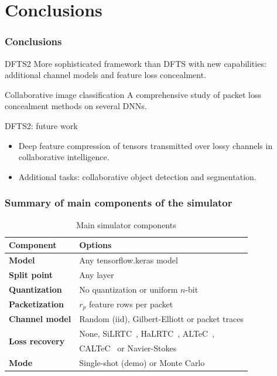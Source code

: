 \documentclass[aspectratio=169]{beamer}
\begin{document}
\section{Conclusions}
\begin{frame}
\frametitle{Conclusions}
	\begin{block}{DFTS2}
		More sophisticated framework than DFTS with new capabilities: additional channel models and feature loss concealment.
	\end{block}
\begin{block}{Collaborative image classification}
	A comprehensive study of packet loss concealment methods on several DNNs.
\end{block}
\begin{block}{DFTS2: future work}
\begin{itemize}
    \item Deep feature compression of tensors transmitted over lossy channels in collaborative intelligence.
    \item Additional tasks: collaborative object detection and segmentation.
\end{itemize}
\end{block}
\end{frame}

\begin{frame}
\frametitle{Summary of main components of the simulator}
\begin{table}[t]   \caption{Main simulator components}
  \label{tab:description:components}
  \centering
 \begin{tabular}{ l | l }
   \textbf{Component} & \textbf{Options} \\
      \hline
      \hline
      \textbf{Model} & Any tensorflow.keras model \\
      \hline  
      \textbf{Split point} & Any layer \\
      \hline
      \textbf{Quantization} & No quantization or uniform $n$-bit \\
      \hline
      \textbf{Packetization} & $r_p$ feature rows per packet \\
      \hline
      \textbf{Channel model} & Random (iid), Gilbert-Elliott or packet traces    \\
      \hline
      \multirow{2}{*}{\textbf{Loss recovery}} & None, SiLRTC~\cite{liu2012tensor}, HaLRTC~\cite{liu2012tensor}, ALTeC~\cite{Bragile2020}, \\ & CALTeC~\cite{CALTeC_ICIP_2021} or Navier-Stokes~\cite{navierstokes}\\
      \hline
      \textbf{Mode} & Single-shot (demo) or Monte Carlo\\ 
      \hline
    \end{tabular}
\end{table}
\end{frame}
\end{document}
